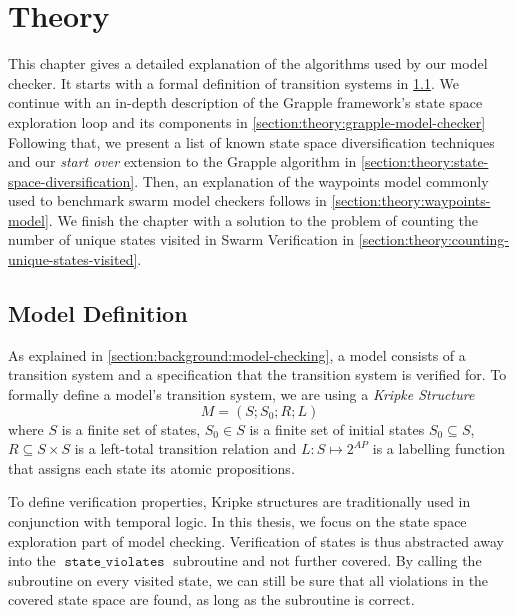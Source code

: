 \documentclass[
fancyheadings, %
%
%
]{stsreprt}
\DeclareMathOperator{\sViolates}{\texttt{state\_violates}}
\begin{document}


\chapter{Theory}
\label{chapter:theory}

This chapter gives a detailed explanation of the algorithms used by our model checker.
It starts with a formal definition of transition systems in \cref{section:theory:model-definition}.
We continue with an in-depth description of the Grapple framework's state space exploration loop and its components in \cref{section:theory:grapple-model-checker}
Following that, we present a list of known state space diversification techniques and our \emph{start over} extension to the Grapple algorithm in \cref{section:theory:state-space-diversification}.
Then, an explanation of the waypoints model commonly used to benchmark swarm model checkers follows in \cref{section:theory:waypoints-model}.
We finish the chapter with a solution to the problem of counting the number of unique states visited in Swarm Verification in \cref{section:theory:counting-unique-states-visited}.


\section{Model Definition}
\label{section:theory:model-definition}

As explained in \cref{section:background:model-checking}, a model consists of a transition system and a specification that the transition system is verified for.
To formally define a model's transition system, we are using a \emph{Kripke Structure} \[M = \left(S; S_0; R; L \right)\] where $S$ is a finite set of states, $S_0 \in S$ is a finite set of initial states $S_0 \subseteq S$, $R \subseteq S \times S$ is a left-total transition relation and $L : S \mapsto 2^{AP}$ is a labelling function that assigns each state its atomic propositions.

To define verification properties, Kripke structures are traditionally used in conjunction with temporal logic.
In this thesis, we focus on the state space exploration part of model checking.
Verification of states is thus abstracted away into the $\sViolates$ subroutine and not further covered.
By calling the subroutine on every visited state, we can still be sure that all violations in the covered state space are found, as long as the subroutine is correct.
\end{document}
